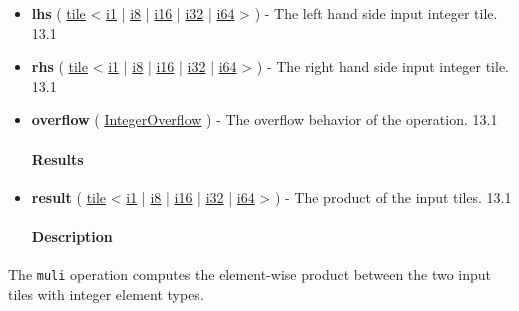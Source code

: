 \documentclass{article}
\begin{document}
\begin{itemize}
\item \textbf{lhs} ( \href{https://docs.nvidia.com/cuda/tile-ir/latest/sections/types.html#type-tile}{tile} < \href{https://docs.nvidia.com/cuda/tile-ir/latest/sections/types.html#subsection-element-types}{i1} | \href{https://docs.nvidia.com/cuda/tile-ir/latest/sections/types.html#subsection-element-types}{i8} | \href{https://docs.nvidia.com/cuda/tile-ir/latest/sections/types.html#subsection-element-types}{i16} | \href{https://docs.nvidia.com/cuda/tile-ir/latest/sections/types.html#subsection-element-types}{i32} | \href{https://docs.nvidia.com/cuda/tile-ir/latest/sections/types.html#subsection-element-types}{i64} > ) - The left hand side input integer tile. 13.1
\item \textbf{rhs} ( \href{https://docs.nvidia.com/cuda/tile-ir/latest/sections/types.html#type-tile}{tile} < \href{https://docs.nvidia.com/cuda/tile-ir/latest/sections/types.html#subsection-element-types}{i1} | \href{https://docs.nvidia.com/cuda/tile-ir/latest/sections/types.html#subsection-element-types}{i8} | \href{https://docs.nvidia.com/cuda/tile-ir/latest/sections/types.html#subsection-element-types}{i16} | \href{https://docs.nvidia.com/cuda/tile-ir/latest/sections/types.html#subsection-element-types}{i32} | \href{https://docs.nvidia.com/cuda/tile-ir/latest/sections/types.html#subsection-element-types}{i64} > ) - The right hand side input integer tile. 13.1
\item \textbf{overflow} ( \href{https://docs.nvidia.com/cuda/tile-ir/latest/sections/operations.html#op-attribute-cuda-tile-muli-integeroverflow-attr}{IntegerOverflow} ) - The overflow behavior of the operation. 13.1


\paragraph{Results}

\item \textbf{result} ( \href{https://docs.nvidia.com/cuda/tile-ir/latest/sections/types.html#type-tile}{tile} < \href{https://docs.nvidia.com/cuda/tile-ir/latest/sections/types.html#subsection-element-types}{i1} | \href{https://docs.nvidia.com/cuda/tile-ir/latest/sections/types.html#subsection-element-types}{i8} | \href{https://docs.nvidia.com/cuda/tile-ir/latest/sections/types.html#subsection-element-types}{i16} | \href{https://docs.nvidia.com/cuda/tile-ir/latest/sections/types.html#subsection-element-types}{i32} | \href{https://docs.nvidia.com/cuda/tile-ir/latest/sections/types.html#subsection-element-types}{i64} > ) - The product of the input tiles. 13.1


\paragraph{Description}

\end{itemize}
The \texttt{muli} operation computes the element-wise product between the two input tiles with integer element types.
\end{document}
